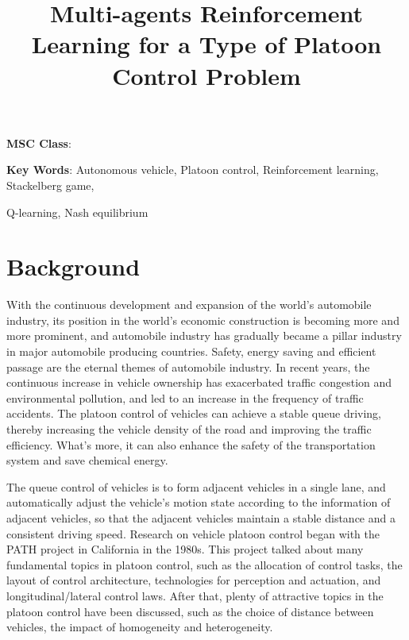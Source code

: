 \documentclass{article}
\title{Multi-agents Reinforcement Learning for a Type of Platoon Control Problem}
\begin{document}
\maketitle

\begin{abstract}


\end{abstract}



\hspace{.2in} {\bf MSC Class}: 

\hspace{.2in} {\bf Key Words}: Autonomous vehicle, Platoon control, Reinforcement learning, Stackelberg game,

\hspace{1.1in}  
Q-learning, Nash equilibrium



\newpage

\section{Background}
With the continuous development and expansion of the world's automobile industry, its position in the world's economic construction is becoming more and more prominent, and automobile industry has gradually became a pillar industry in major automobile producing countries.  Safety, energy saving and efficient passage are the eternal themes of automobile industry. In recent years, the continuous increase in vehicle ownership has exacerbated traffic congestion and environmental pollution, and led to an increase in the frequency of traffic accidents. The platoon control of vehicles can achieve a stable queue driving, thereby increasing the vehicle density of the road and improving the traffic efficiency. What's more, it can also enhance the safety of the transportation system and save chemical energy.

The queue control of vehicles is to form adjacent vehicles in a single lane, and automatically adjust the vehicle's motion state according to the information of adjacent vehicles, so that the adjacent vehicles maintain a stable distance and a consistent driving speed. Research on vehicle platoon control began with the PATH project in California in the 1980s. This project talked about many fundamental topics in platoon control, such as the allocation of control tasks, the layout of control architecture, technologies for perception and actuation, and longitudinal/lateral control laws. After that, plenty of attractive topics in the platoon control have been discussed, such as the choice of distance between vehicles, the impact of homogeneity and heterogeneity. 
\end{document}
